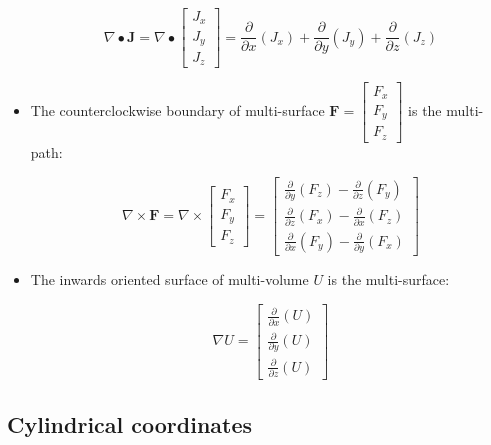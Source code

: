 \begin{itemize}
\[\nabla \bullet \mathbf{J} = \nabla \bullet \begin{bmatrix} J_x \\ J_y \\ J_z \end{bmatrix} = \frac{\partial}{\partial x}(J_x) + \frac{\partial}{\partial y}(J_y) + \frac{\partial}{\partial z}(J_z)\]
\item The counterclockwise boundary of multi-surface \(\mathbf{F} = \begin{bmatrix} F_x \\ F_y \\ F_z \end{bmatrix}\) is the multi-path:

\[\nabla \times \mathbf{F} = \nabla \times \begin{bmatrix} F_x \\ F_y \\ F_z \end{bmatrix} = \begin{bmatrix} \frac{\partial}{\partial y}(F_z) - \frac{\partial}{\partial z}(F_y) \\ \frac{\partial}{\partial z}(F_x) - \frac{\partial}{\partial x}(F_z) \\ \frac{\partial}{\partial x}(F_y) - \frac{\partial}{\partial y}(F_x) \end{bmatrix}\]
\item The inwards oriented surface of multi-volume \(U\) is the multi-surface:

\[\nabla U = \begin{bmatrix} \frac{\partial}{\partial x}(U) \\ \frac{\partial}{\partial y}(U) \\ \frac{\partial}{\partial z}(U) \end{bmatrix}\]
\end{itemize}




\subsection{Cylindrical coordinates}

